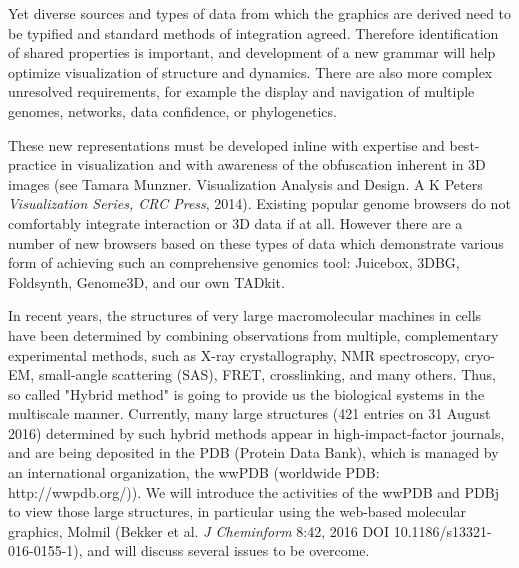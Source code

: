 \documentclass[a4paper]{article}
\begin{document}
Yet diverse sources and types of data from which the graphics are derived need to be typified and standard methods of integration agreed. Therefore identification of shared properties is important, and development of a new grammar will help optimize visualization of structure and dynamics. There are also more complex unresolved requirements, for example the display and navigation of multiple genomes, networks, data confidence, or phylogenetics.

These new representations must be developed inline with expertise and best-practice in visualization and with awareness of the obfuscation inherent in 3D images (see Tamara Munzner. Visualization Analysis and Design. A K Peters \emph{Visualization Series, CRC Press}, 2014). Existing popular genome browsers do not comfortably integrate interaction or 3D data if at all. However there are a number of new browsers based on these types of data which demonstrate various form of achieving such an comprehensive genomics tool: Juicebox, 3DBG, Foldsynth, Genome3D, and our own TADkit.


In recent years, the structures of very large macromolecular machines in cells have been determined by combining observations from multiple, complementary experimental methods, such as X-ray crystallography, NMR spectroscopy, cryo-EM, small-angle scattering (SAS), FRET, crosslinking, and many others. Thus, so called "Hybrid method" is going to provide us the biological systems in the multiscale manner. Currently, many large structures (421 entries on 31 August 2016) determined by such hybrid methods appear in high-impact-factor journals, and are being deposited in the PDB (Protein Data Bank), which is managed by an international organization, the wwPDB (worldwide PDB: http://wwpdb.org/)). We will introduce the activities of the wwPDB and PDBj to view those large structures, in particular using the web-based molecular graphics, Molmil (Bekker et al. \emph{J Cheminform} 8:42, 2016 DOI 10.1186/s13321-016-0155-1), and will discuss several issues to be overcome. 


\end{document}
